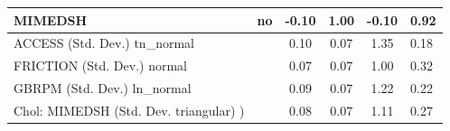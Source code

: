 \begin{table}
\begin{center}
\begin{tabular}{|l|l|c|c|c|l|}
			\hline
			MIMEDSH & no & -0.10 & 1.00 & -0.10 & 0.92 \\
			\hline
			ACCESS (Std. Dev.) tn_normal &  & 0.10 & 0.07 & 1.35 & 0.18 \\
			\hline
			FRICTION (Std. Dev.) normal &  & 0.07 & 0.07 & 1.00 & 0.32 \\
			\hline
			GBRPM (Std. Dev.) ln_normal &  & 0.09 & 0.07 & 1.22 & 0.22 \\
			\hline
			 Chol: MIMEDSH (Std. Dev. triangular) ) &  & 0.08 & 0.07 & 1.11 & 0.27 \\
			\hline
		\end{tabular}
	\end{center}
\end{table}